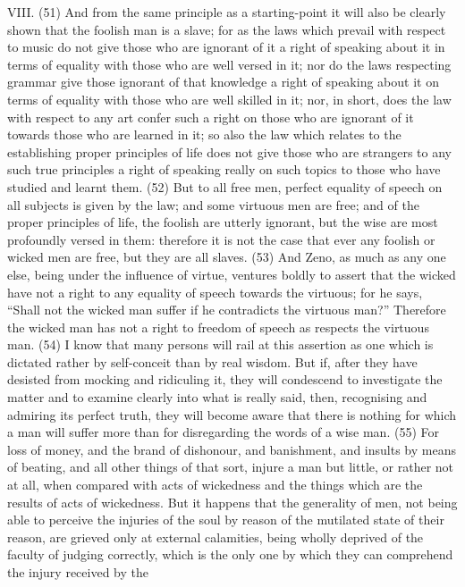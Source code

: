 VIII. (51) And from the same principle as a starting-point it will also be clearly shown that the foolish
man is a slave; for as the laws which prevail with respect to music do not give those who are
ignorant of it a right of speaking about it in terms of equality with those who are well versed in it; nor
do the laws respecting grammar give those ignorant of that knowledge a right of speaking about it
on terms of equality with those who are well skilled in it; nor, in short, does the law with respect to
any art confer such a right on those who are ignorant of it towards those who are learned in it; so
also the law which relates to the establishing proper principles of life does not give those who are
strangers to any such true principles a right of speaking really on such topics to those who have
studied and learnt them. (52) But to all free men, perfect equality of speech on all subjects is given
by the law; and some virtuous men are free; and of the proper principles of life, the foolish are
utterly ignorant, but the wise are most profoundly versed in them: therefore it is not the case that
ever any foolish or wicked men are free, but they are all slaves. (53) And Zeno, as much as any
one else, being under the influence of virtue, ventures boldly to assert that the wicked have not a
right to any equality of speech towards the virtuous; for he says, ``Shall not the wicked man suffer if
he contradicts the virtuous man?'' Therefore the wicked man has not a right to freedom of speech
as respects the virtuous man. (54) I know that many persons will rail at this assertion as one which
is dictated rather by self-conceit than by real wisdom. But if, after they have desisted from mocking
and ridiculing it, they will condescend to investigate the matter and to examine clearly into what is
really said, then, recognising and admiring its perfect truth, they will become aware that there is
nothing for which a man will suffer more than for disregarding the words of a wise man. (55) For
loss of money, and the brand of dishonour, and banishment, and insults by means of beating, and
all other things of that sort, injure a man but little, or rather not at all, when compared with acts of
wickedness and the things which are the results of acts of wickedness. But it happens that the
generality of men, not being able to perceive the injuries of the soul by reason of the mutilated
state of their reason, are grieved only at external calamities, being wholly deprived of the faculty of
judging correctly, which is the only one by which they can comprehend the injury received by the

